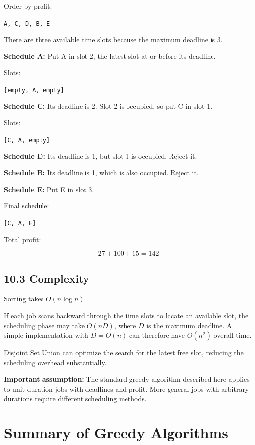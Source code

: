 Order by profit:

\texttt{A, C, D, B, E}

There are three available time slots because the maximum deadline is 3.

\textbf{Schedule A:} Put A in slot 2, the latest slot at or before its deadline.

Slots:

\texttt{[empty, A, empty]}

\textbf{Schedule C:} Its deadline is 2. Slot 2 is occupied, so put C in slot 1.

Slots:

\texttt{[C, A, empty]}

\textbf{Schedule D:} Its deadline is 1, but slot 1 is occupied. Reject it.

\textbf{Schedule B:} Its deadline is 1, which is also occupied. Reject it.

\textbf{Schedule E:} Put E in slot 3.

Final schedule:

\texttt{[C, A, E]}

Total profit:


\[
27+100+15=\boxed{142}
\]


\subsection{10.3 Complexity}

Sorting takes $O(n\log n)$.

If each job scans backward through the time slots to locate an available slot, the scheduling phase may take $O(nD)$, where $D$ is the maximum deadline. A simple implementation with $D=O(n)$ can therefore have $O(n^2)$ overall time.

Disjoint Set Union can optimize the search for the latest free slot, reducing the scheduling overhead substantially.

\textbf{Important assumption:} The standard greedy algorithm described here applies to unit-duration jobs with deadlines and profit. More general jobs with arbitrary durations require different scheduling methods.

\section{Summary of Greedy Algorithms}

